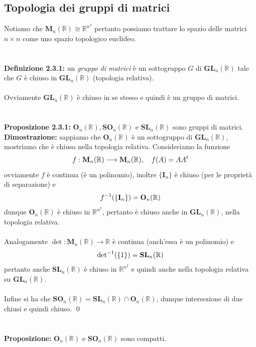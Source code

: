 \documentclass{article}
\begin{document}
\newpage
\subsection{Topologia dei gruppi di matrici}
Notiamo che $\mathbf{M}_n(\mathbb{R}) \cong \mathbb{R}^{n^2}$ pertanto possiamo trattare lo spazio delle matrici $n \times n$ come uno spazio topologico euclideo. \\ \\ \\
\textbf{Definizione 2.3.1:} un \textit{gruppo di matrici} è un sottogruppo $G$ di $\mathbf{GL}_n(\mathbb{R})$ tale che $G$ è chiuso in $\mathbf{GL}_n(\mathbb{R})$ (topologia relativa). \\ \\
Ovviamente $\mathbf{GL}_n(\mathbb{R})$ è chiuso in se stesso e quindi è un gruppo di matrici. \\ \\ \\
\textbf{Proposizione 2.3.1:} $\mathbf{O}_n(\mathbb{R}), \mathbf{SO}_n(\mathbb{R})$ e $\mathbf{SL}_n(\mathbb{R})$ sono gruppi di matrici. \\

\textbf{Dimostrazione:} sappiamo che $\mathbf{O}_n(\mathbb{R})$ è un sottogruppo di $\mathbf{GL}_n(\mathbb{R})$, mostriamo che è chiuso nella topologia relativa. Consideriamo la funzione
\begin{gather}
    f : \mathbf{M}_n(\mathbb{R}) \longrightarrow \mathbf{M}_n(\mathbb{R}), \quad f(A) = AA^t \notag
\end{gather}
ovviamente $f$ è continua (è un polinomio), inoltre $\{ \mathbf{I}_n \}$ è chiuso (per le proprietà di separazione) e
\begin{gather}
    f^{-1}(\{ \mathbf{I}_n \}) = \mathbf{O}_n(\mathbb{R}) \notag
\end{gather}
dunque $\mathbf{O}_n(\mathbb{R})$ è chiuso in $\mathbb{R}^{n^2}$, pertanto è chiuso anche in $\mathbf{GL}_n(\mathbb{R})$, nella topologia relativa. \\ \\
Analogamente $\det : \mathbf{M}_n(\mathbb{R}) \longrightarrow \mathbb{R}$ è continua (anch'essa è un polinomio) e
\begin{gather}
    \mathrm{det}^{-1}(\{ 1 \}) = \mathbf{SL}_n(\mathbb{R}) \notag
\end{gather}
pertanto anche $\mathbf{SL}_n(\mathbb{R})$ è chiuso in $\mathbb{R}^{n^2}$ e quindi anche nella topologia relativa su $\mathbf{GL}_n(\mathbb{R})$. \\ \\
Infine si ha che $\mathbf{SO}_n(\mathbb{R}) = \mathbf{SL}_n(\mathbb{R}) \cap \mathbf{O}_n(\mathbb{R})$, dunque intersezione di due chiusi e quindi chiuso. \qed \\ \\ \\
\textbf{Proposizione:} $\mathbf{O}_n(\mathbb{R})$ e $\mathbf{SO}_n(\mathbb{R})$ sono compatti. \\
\end{document}
